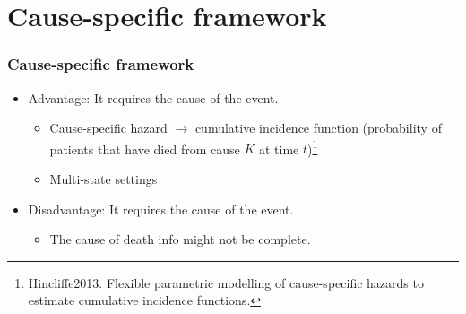 \documentclass{beamer}
\begin{document}
\section{Cause-specific framework}
\begin{frame}
\frametitle{Cause-specific framework}

\begin{itemize}
\item Advantage: It requires the cause of the event. \begin{itemize}
    \item Cause-specific hazard $\rightarrow$ cumulative incidence function (probability of patients that have died from cause $K$ at time $t$)\footnote{Hincliffe2013. Flexible parametric modelling of cause-specific hazards to estimate cumulative incidence functions.}
    \item Multi-state settings
\end{itemize}

\item Disadvantage: It requires the cause of the event.
\begin{itemize}
    \item The cause of death info might not be complete.
\end{itemize}
\end{itemize}
\end{frame}
\end{document}
